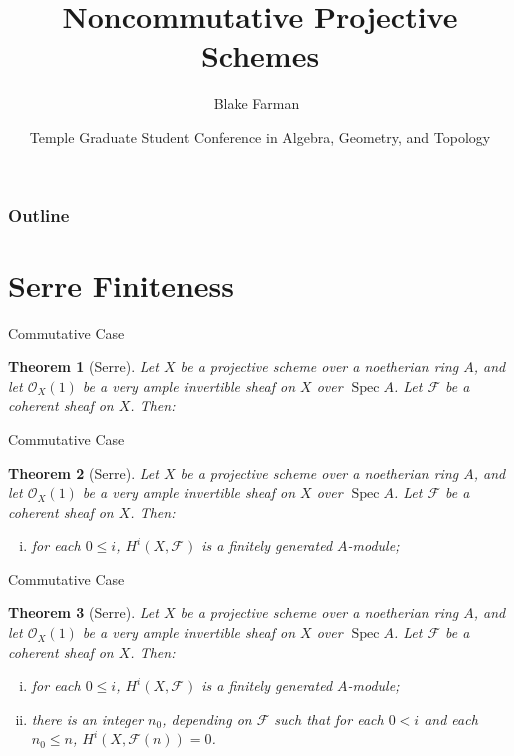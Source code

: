 \documentclass{beamer}
\title %
{Noncommutative Projective Schemes}
\author[Farman]
{Blake Farman~\inst{1}}
\institute[USC]{
\inst{1}
University of South Carolina, Columbia, SC USA}
\date[May 28, 2015]
{Temple Graduate Student Conference in Algebra, Geometry, and Topology}
\newtheorem{thm}{Theorem}
\theoremstyle{definition}
\begin{document}
\begin{frame}
  \titlepage
\end{frame}

\begin{frame}
  \frametitle{Outline}
  \tableofcontents[pausesections]
\end{frame}




\section{Serre Finiteness}

\begin{frame}{Commutative Case}
  \begin{thm}[Serre]
    Let $X$ be a projective scheme over a noetherian ring $A$, and let $\mathcal{O}_X(1)$ be a very ample invertible sheaf on $X$ over $\operatorname{Spec} A$.
    Let $\mathscr{F}$ be a coherent sheaf on $X$. Then:
  \end{thm}
\end{frame}

\begin{frame}{Commutative Case}
  \setcounter{thm}{0}
  \begin{thm}[Serre]
    Let $X$ be a projective scheme over a noetherian ring $A$, and let $\mathcal{O}_X(1)$ be a very ample invertible sheaf on $X$ over $\operatorname{Spec} A$.
    Let $\mathscr{F}$ be a coherent sheaf on $X$. Then:
    \begin{enumerate}[(i)]
    \item
      for each $0 \leq i$, $H^i(X,\mathscr{F})$ is a finitely generated $A$-module;
    \end{enumerate}
  \end{thm}
\end{frame}

\begin{frame}{Commutative Case}
  \setcounter{thm}{0}
  \begin{thm}[Serre]
    Let $X$ be a projective scheme over a noetherian ring $A$, and let $\mathcal{O}_X(1)$ be a very ample invertible sheaf on $X$ over $\operatorname{Spec} A$.
    Let $\mathscr{F}$ be a coherent sheaf on $X$. Then:
    \begin{enumerate}[(i)]
    \item
      for each $0 \leq i$, $H^i(X,\mathscr{F})$ is a finitely generated $A$-module;
    \item
      there is an integer $n_0$, depending on $\mathscr{F}$ such that for each $0 < i$ and each $n_0 \leq n$, $H^i(X, \mathscr{F}(n)) = 0$.
    \end{enumerate}
  \end{thm}
\end{frame}
\end{document}
